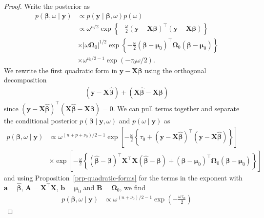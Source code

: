 \documentclass[
  11pt,
  letterpaper,
]{scrbook}
\theoremstyle{definition}
\theoremstyle{definition}
\theoremstyle{definition}
\theoremstyle{plain}
\theoremstyle{plain}
\theoremstyle{plain}
\theoremstyle{remark}
\begin{document}
\begin{proof}
Write the posterior as \begin{align*}
 p(\boldsymbol{\beta}, \omega \mid \boldsymbol{y}) &\propto p(\boldsymbol{y} \mid \boldsymbol{\beta}, \omega) p(\omega)
 \\& \propto  \omega^{n/2} \exp\left\{-\frac{\omega}{2}(\boldsymbol{y}-\mathbf{X}\boldsymbol{\beta})^\top(\boldsymbol{y}-\mathbf{X}\boldsymbol{\beta})\right\}\\& \times |\omega\boldsymbol{\Omega}_0|^{1/2}\exp \left\{ -\frac{\omega}{2} (\boldsymbol{\beta}-\boldsymbol{\mu}_0)^\top\boldsymbol{\Omega}_0(\boldsymbol{\beta}-\boldsymbol{\mu}_0)\right\} \\& \times \omega^{\nu_0/2-1}\exp\left(-\tau_0\omega/2\right).
\end{align*} We rewrite the first quadratic form in
\(\boldsymbol{y}-\mathbf{X}\boldsymbol{\beta}\) using the orthogonal
decomposition \begin{align*}
 (\boldsymbol{y}-\mathbf{X}\widehat{\boldsymbol{\beta}}) + (\mathbf{X}\widehat{\boldsymbol{\beta}} - \mathbf{X}\boldsymbol{\beta})
\end{align*} since
\((\boldsymbol{y}-\mathbf{X}\widehat{\boldsymbol{\beta}})^\top (\mathbf{X}\widehat{\boldsymbol{\beta}} - \mathbf{X}\boldsymbol{\beta}) = 0.\)
We can pull terms together and separate the conditional posterior
\(p(\boldsymbol{\beta} \mid \boldsymbol{y}, \omega)\) and
\(p(\omega \mid \boldsymbol{y})\) as \begin{align*}
 p(\boldsymbol{\beta}, \omega \mid \boldsymbol{y}) &\propto \omega^{(n+p+\nu_0)/2 -1} \exp\left[-\frac{\omega}{2}\left\{\tau_0 + (\boldsymbol{y}-\mathbf{X}\widehat{\boldsymbol{\beta}})^\top(\boldsymbol{y}-\mathbf{X}\widehat{\boldsymbol{\beta}})\right\}\right]
 \\& \times \exp \left[-\frac{\omega}{2}\left\{(\widehat{\boldsymbol{\beta}} - \boldsymbol{\beta})^\top\mathbf{X}^\top\mathbf{X}(\widehat{\boldsymbol{\beta}} - \boldsymbol{\beta})+ (\boldsymbol{\beta}-\boldsymbol{\mu}_0)^\top\boldsymbol{\Omega}_0(\boldsymbol{\beta}-\boldsymbol{\mu}_0)\right\}\right]
\end{align*} and using Proposition~\ref{prp-quadratic-forms} for the
terms in the exponent with
\(\boldsymbol{a} = \widehat{\boldsymbol{\beta}}\),
\(\mathbf{A}=\mathbf{X}^\top\mathbf{X}\),
\(\boldsymbol{b} = \boldsymbol{\mu}_0\) and
\(\mathbf{B}=\boldsymbol{\Omega}_0\), we find \begin{align*}
  p(\boldsymbol{\beta}, \omega \mid \boldsymbol{y}) & \propto
   \omega^{(n+\nu_0)/2 -1} \exp\left(-\frac{\omega\tau_n}{2}\right)

\end{align*}
\end{proof}
\end{document}
